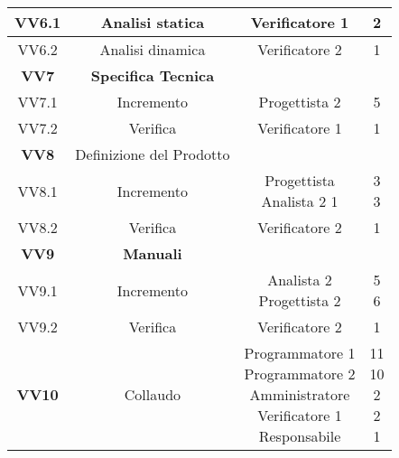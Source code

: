 \documentclass{scalatekids-article}
\begin{document}
\begin{center}
\begin{tabular}{| c | c | c | c |}
    \hline
    VV6.1 & Analisi statica & Verificatore 1 & 2\\
    \hline
    VV6.2 & Analisi dinamica & Verificatore 2 & 1\\
    \hline
    \textbf{VV7} & \textbf{Specifica Tecnica} & &\\
    \hline
    VV7.1 & Incremento & Progettista 2 & 5\\
    \hline
    VV7.2 & Verifica & Verificatore 1 & 1\\
    \hline
    \textbf{VV8} & Definizione del Prodotto & &\\
    \hline
    VV8.1 & Incremento & \multiLineCell[t]{Progettista\\Analista 2} 1 & \multiLineCell[t]{3\\3}\\
    \hline
    VV8.2 & Verifica & Verificatore 2 & 1\\
    \hline
    \textbf{VV9} & \textbf{Manuali} & &\\
    \hline
    VV9.1 & Incremento & \multiLineCell[t]{Analista 2\\Progettista 2} &\multiLineCell[t]{5\\6}\\
    \hline
    VV9.2 & Verifica & Verificatore 2 & 1\\
    \hline
    \textbf{VV10} & Collaudo & \multiLineCell[t]{Programmatore 1\\Programmatore 2\\Amministratore\\Verificatore 1\\Responsabile} & \multiLineCell[t]{11\\10\\2\\2\\1}\\
    \hline
  \end{tabular}
\end{center}
\normalsize
\newpage
\end{document}
